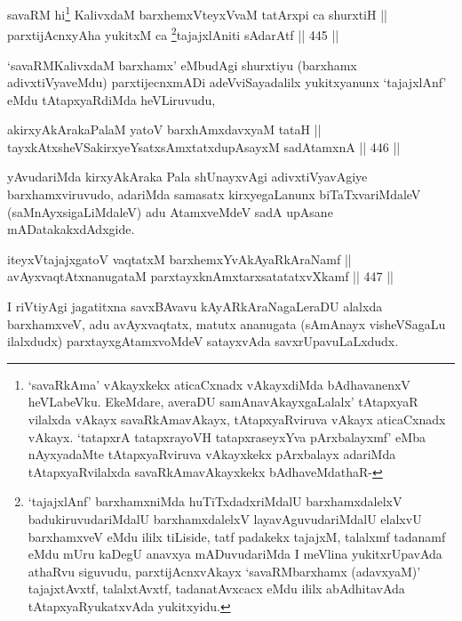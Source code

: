 \begin{shl}
savaRM hi\footnote{`savaRkAma' vAkayxkekx aticaCxnadx vAkayxdiMda bAdhavanenxV heVLabeVku. EkeMdare, averaDU samAnavAkayxgaLalalx' tAtapxyaR vilalxda vAkayx savaRkAmavAkayx, tAtapxyaRviruva vAkayx aticaCxnadx vAkayx. `tatapxrA tatapxrayoVH tatapxraseyxYva pArxbalayxmf' eMba nAyxyadaMte tAtapxyaRviruva vAkayxkekx pArxbalayx adariMda tAtapxyaRvilalxda savaRkAmavAkayxkekx bAdhaveMdathaR-} KalivxdaM barxhemxVteyxVvaM tatArxpi ca shurxtiH || \\
parxtijAcnxyA\s \s ha yukitxM ca \footnote{`tajajxlAnf' barxhamxniMda huTiTxdadxriMdalU barxhamxdalelxV badukiruvudariMdalU barxhamxdalelxV layavAguvudariMdalU elalxvU barxhamxveV eMdu ililx tiLiside, tatf padakekx tajajxM, talalxmf tadanamf eMdu mUru kaDegU anavxya mADuvudariMda I meVlina yukitxrUpavAda athaRvu siguvudu, parxtijAcnxvAkayx `savaRMbarxhamx (adavxyaM)' tajajxtAvxtf, talalxtAvxtf, tadanatAvxcacx eMdu ililx abAdhitavAda tAtapxyaRyukatxvAda yukitxyidu.}tajajxlAniti sAdarAtf \hfill || 445 ||  
\end{shl}


\begin{artha}
`savaRMKalivxdaM barxhamx' eMbudAgi shurxtiyu (barxhamx adivxtiVyaveMdu) parxtijecnxmADi adeVviSayadalilx yukitxyanunx `tajajxlAnf' eMdu tAtapxyaRdiMda heVLiruvudu,
\end{artha}


\begin{shl}
akirxyAkArakaPalaM yatoV barxhAmxdavxyaM tataH || \\
tayxkAtxsheVSakirxyeYsatxsAmxtatxdupAsayxM sadA\s \s tamxnA \hfill || 446 ||  
\end{shl}

\begin{artha}
yAvudariMda kirxyAkAraka Pala shUnayxvAgi adivxtiVyavAgiye barxhamxviruvudo, adariMda samasatx kirxyegaLanunx biTaTxvariMdaleV (saMnAyxsigaLiMdaleV) adu AtamxveMdeV sadA upAsane mADatakakxdAdxgide.
\end{artha}

\begin{shl}
iteyxVtajajxgatoV vaqtatxM barxhemxYvAkAyaRkAraNamf || \\
avAyxvaqtAtxnanugataM parxtayxknAmxtarxsatatatxvXkamf \hfill || 447 ||  
\end{shl}

\begin{artha}
I riVtiyAgi jagatitxna savxBAvavu kAyARkAraNagaLeraDU alalxda
barxhamxveV,  adu avAyxvaqtatx, matutx ananugata (sAmAnayx
visheVSagaLu ilalxdudx) parxtayxgAtamxvoMdeV satayxvAda
savxrUpavuLaLxdudx.
\end{artha}

